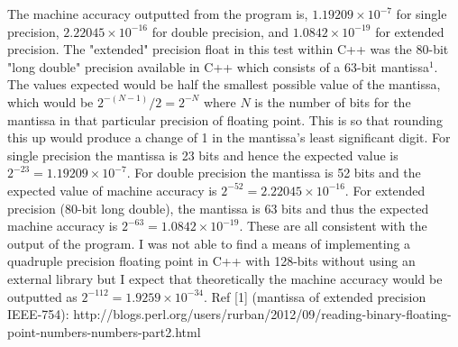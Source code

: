 \documentclass{article}
\begin{document}
The machine accuracy outputted from the program is, $1.19209\times{10^{-7}}$ for single precision,  $2.22045\times{10^{-16}}$ for double precision, and $1.0842\times{10^{-19}}$ for extended precision. The "extended" precision float in this test within C++  was the 80-bit "long double" precision available in C++ which consists of a 63-bit mantissa$^1$. The values expected would be half the smallest possible value of the mantissa, which would be $2^{-(N-1)}/2=2^{-N}$ where $N$ is the number of bits for the mantissa in that particular precision of floating point. This is so that rounding this up would produce a change of 1 in the mantissa’s least significant digit. For single precision the mantissa is 23 bits and hence the expected value is $2^{-23}=1.19209\times{10^{-7}}$. For double precision the mantissa is 52 bits and the expected value of machine accuracy is $2^{-52}=2.22045\times{10^{-16}}$. For extended precision (80-bit long double), the mantissa is 63 bits and thus the expected machine accuracy is  $2^{-63}=1.0842\times{10^{-19}}$. These are all consistent with the output of the program. I was not able to find a means of implementing a quadruple precision floating point in C++ with 128-bits without using an external library but I expect that theoretically the machine accuracy would be outputted as $2^{-112}=1.9259\times{10^{-34}}$.
\newline
\newline
Ref [1] (mantissa of extended precision IEEE-754):
\newline
http://blogs.perl.org/users/rurban/2012/09/reading-binary-floating-point-numbers-numbers-part2.html 
\end{document}
